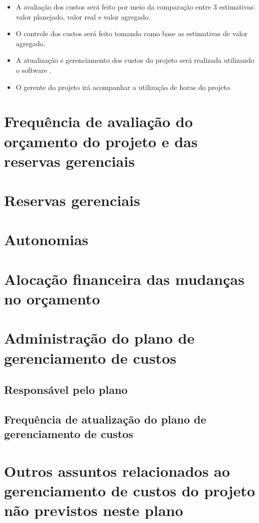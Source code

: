 \begin{itemize}
\item A avaliação dos custos será feito por meio da comparação entre 3 estimativas: valor planejado, valor real e valor agregado. 
\item O controle dos custos será feito tomando como base as estimativas de valor agregado.
\item A atualização e gerenciamento dos custos do projeto será realizada utilizando o software \projectManagementSoftwareName.
\item O gerente do projeto irá acompanhar a utilização de horas do projeto 
\end{itemize}

\section{Frequência de avaliação do orçamento do projeto e das reservas gerenciais}

\section{Reservas gerenciais}

\section{Autonomias}

\section{Alocação financeira das mudanças no orçamento}

\section{Administração do plano de gerenciamento de custos}

\subsection{Responsável pelo plano}

\subsection{Frequência de atualização do plano de gerenciamento de custos}

\section{Outros assuntos relacionados ao gerenciamento de custos do projeto não previstos neste plano}

